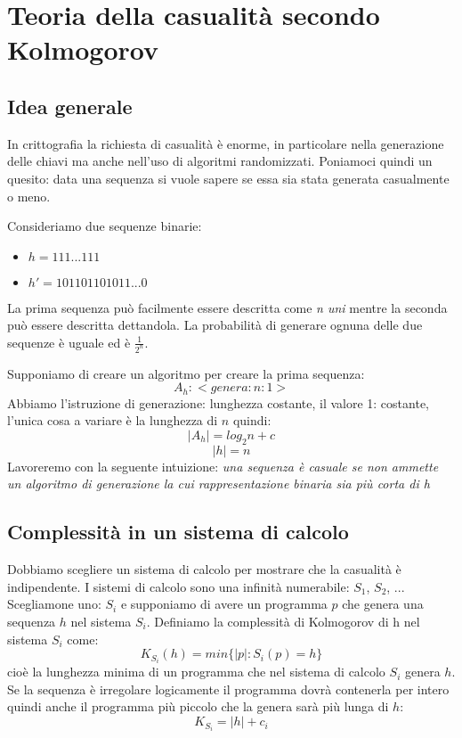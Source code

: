 \section{Teoria della casualità secondo Kolmogorov}
\subsection{Idea generale}
In crittografia la richiesta di casualità è enorme, in particolare nella generazione delle chiavi ma anche nell'uso di algoritmi randomizzati. 
Poniamoci quindi un quesito: data una sequenza si vuole sapere se essa sia stata generata casualmente o meno.

Consideriamo due sequenze binarie:
\begin{itemize}
    \item $h=111...111$
    \item $h\prime=101101101011...0$
\end{itemize}

La prima sequenza può facilmente essere descritta come \emph{n uni} mentre la seconda può essere descritta dettandola. La probabilità di generare ognuna delle due sequenze è uguale ed è $\frac{1}{2^n}$.

Supponiamo di creare un algoritmo per creare la prima sequenza:
$$ A_h:<genera:n:1> $$
Abbiamo l'istruzione di generazione: lunghezza costante, il valore 1: costante, l'unica cosa a variare è la lunghezza di $n$ quindi:
$$ |A_h| = log_2n + c $$
$$ |h| = n$$
Lavoreremo con la seguente intuizione: \emph{una sequenza è casuale se non ammette un algoritmo di generazione la cui rappresentazione binaria sia più corta di h}

\subsection{Complessità in un sistema di calcolo}
Dobbiamo scegliere un sistema di calcolo per mostrare che la casualità è indipendente. I sistemi di calcolo sono una infinità numerabile: $S_1$, $S_2$, ... Scegliamone uno: $S_i$ e supponiamo di avere un programma $p$ che genera una sequenza $h$ nel sistema $S_i$. Definiamo la complessità di Kolmogorov di h nel sistema $S_i$ come: 
$$
    K_{S_i}(h) = min\{ |p| : S_i(p) = h \}
$$
cioè la lunghezza minima di un programma che nel sistema di calcolo $S_i$ genera $h$. Se la sequenza è irregolare logicamente il programma dovrà contenerla per intero quindi anche il programma più piccolo che la genera sarà più lunga di $h$:
$$
    K_{S_i} = |h| + c_i
$$

